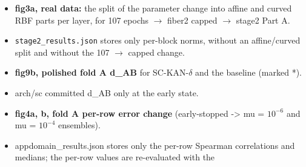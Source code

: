 \begin{itemize}
  \item \textbf{fig3a, real data:} the split of the parameter change into affine and curved RBF parts per layer, for 107 epochs $\to$\allowbreak{} fiber2 capped $\to$\allowbreak{} stage2 Part A.
  \item \texttt{stage2\_\allowbreak{}results.json} stores only per-block norms, without an affine/curved split and without the 107 $\to$\allowbreak{} capped change.
  \item \textbf{fig9b, polished fold A d\_AB} for SC-KAN-$\delta$ and the baseline (marked *).
  \item arch/sc committed d\_AB only at the early state.
  \item \textbf{fig4a, b, fold A per-row error change} (early-stopped -> mu = $10^{-6}$ and mu = $10^{-4}$ ensembles).
  \item appdomain\_results.json stores only the per-row Spearman correlations and medians; the per-row values are re-evaluated with the
\end{itemize}